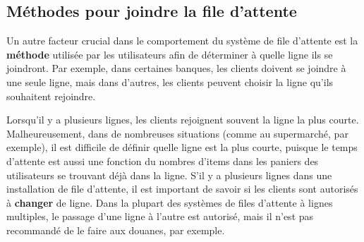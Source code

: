 \subsection{Méthodes pour joindre la file d'attente}
Un autre facteur crucial dans le comportement du système de file d'attente est la \textbf{méthode} utilisée par les utilisateurs afin de déterminer à quelle ligne ils se joindront. Par exemple, dans certaines banques, les clients doivent se joindre à une seule ligne, mais dans d'autres, les clients peuvent choisir la ligne qu'ils souhaitent rejoindre. \par Lorsqu'il y a plusieurs lignes, les clients rejoignent souvent la ligne la plus courte. Malheureusement, dans de nombreuses situations (comme au supermarché, par exemple), il est difficile de définir quelle ligne est la plus courte, puisque le temps d’attente est aussi une fonction du nombres d’items dans les paniers des utilisateurs se trouvant déjà dans la ligne. S'il y a plusieurs lignes dans une installation de file d'attente, il est important de savoir si les clients sont autorisés à \textbf{changer} de ligne. Dans la plupart des systèmes de files d'attente à lignes multiples, le passage d’une ligne à l’autre  est autorisé, mais il n'est pas recommandé de le faire aux douanes, par exemple. 
